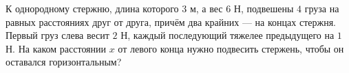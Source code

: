 К однородному стержню, длина которого $3$ м, а вес $6$ Н, подвешены $4$
груза на равных расстояниях друг от друга, причём два крайних --- на
концах стержня. Первый груз слева весит $2$ Н, каждый последующий
тяжелее предыдущего на $1$ Н. На каком расстоянии $x$ от левого конца
нужно подвесить стержень, чтобы он оставался горизонтальным?
